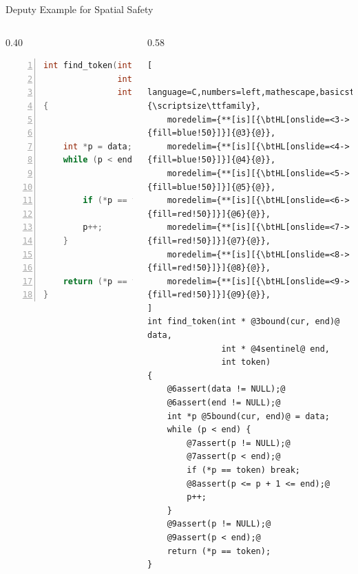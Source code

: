 \documentclass[aspectratio=169]{beamer}
\begin{document}
\begin{frame}[fragile]{Deputy Example for Spatial Safety}
\begin{columns}[T]
\begin{column}{0.40\textwidth}
\begin{lstlisting}[language=C,numbers=left,mathescape,basicstyle={\scriptsize\ttfamily}]
int find_token(int *data,
               int *end,
               int token)
{


    int *p = data;
    while (p < end) {


        if (*p == token) break;

        p++;
    }


    return (*p == token);
}
\end{lstlisting}
\end{column}


\pause

\begin{column}{0.58\textwidth}
\begin{lstlisting}[
    language=C,numbers=left,mathescape,basicstyle={\scriptsize\ttfamily},
    moredelim={**[is][{\btHL[onslide=<3->{fill=blue!50}]}]{@3}{@}},
    moredelim={**[is][{\btHL[onslide=<4->{fill=blue!50}]}]{@4}{@}},
    moredelim={**[is][{\btHL[onslide=<5->{fill=blue!50}]}]{@5}{@}},
    moredelim={**[is][{\btHL[onslide=<6->{fill=red!50}]}]{@6}{@}},
    moredelim={**[is][{\btHL[onslide=<7->{fill=red!50}]}]{@7}{@}},
    moredelim={**[is][{\btHL[onslide=<8->{fill=red!50}]}]{@8}{@}},
    moredelim={**[is][{\btHL[onslide=<9->{fill=red!50}]}]{@9}{@}},
]
int find_token(int * @3bound(cur, end)@ data,
               int * @4sentinel@ end,
               int token)
{
    @6assert(data != NULL);@
    @6assert(end != NULL);@
    int *p @5bound(cur, end)@ = data;
    while (p < end) {
        @7assert(p != NULL);@
        @7assert(p < end);@
        if (*p == token) break;
        @8assert(p <= p + 1 <= end);@
        p++;
    }
    @9assert(p != NULL);@
    @9assert(p < end);@
    return (*p == token);
}
\end{lstlisting}
\end{column}

\end{columns}
\end{frame}
\end{document}
